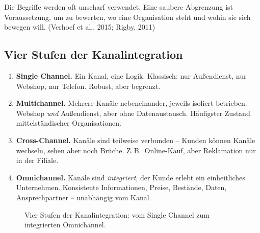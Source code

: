 \documentclass[11pt,a4paper,oneside]{article}
\newcommand{\fachbegriff}[1]{\textbf{#1}}
\newcommand{\quelle}[1]{{\footnotesize\color{lpGray}(#1)}}
\begin{document}
Die Begriffe werden oft unscharf verwendet. Eine saubere Abgrenzung ist Voraussetzung, um zu bewerten, wo eine Organisation steht und wohin sie sich bewegen will. \quelle{Verhoef et al., 2015; Rigby, 2011}

\subsection{Vier Stufen der Kanalintegration}

\begin{enumerate}
  \item \fachbegriff{Single Channel.} Ein Kanal, eine Logik. Klassisch: nur Außendienst, nur Webshop, nur Telefon. Robust, aber begrenzt.
  \item \fachbegriff{Multichannel.} Mehrere Kanäle nebeneinander, jeweils isoliert betrieben. Webshop \emph{und} Außendienst, aber ohne Datenaustausch. Häufigster Zustand mittelständischer Organisationen.
  \item \fachbegriff{Cross-Channel.} Kanäle sind teilweise verbunden -- Kunden können Kanäle wechseln, sehen aber noch Brüche. Z.\,B.\ Online-Kauf, aber Reklamation nur in der Filiale.
  \item \fachbegriff{Omnichannel.} Kanäle sind \emph{integriert}, der Kunde erlebt ein einheitliches Unternehmen. Konsistente Informationen, Preise, Bestände, Daten, Ansprechpartner -- unabhängig vom Kanal.
\end{enumerate}

\begin{figure}[h]
\centering
{}
\caption{\sffamily Vier Stufen der Kanalintegration: vom Single Channel zum integrierten Omnichannel.}
\label{fig:kanalstufen-22t06}
\end{figure}
\end{document}

